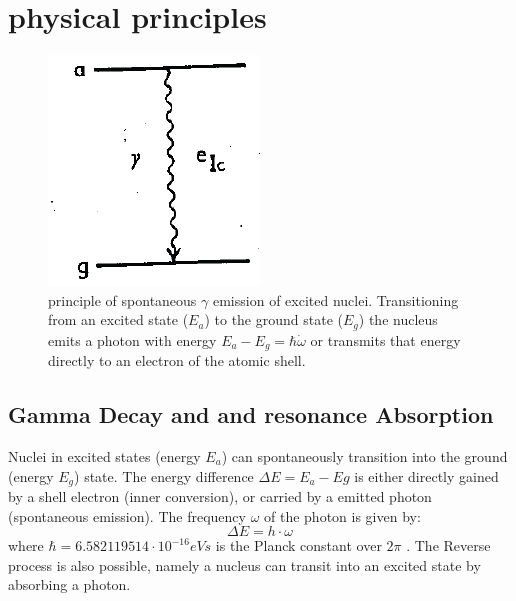 
\section{physical principles}
\begin{figure}[H]
	\centering
	\includegraphics[height=0.18\textheight]{graphics/Emission}
	\caption[spontaneous $\gamma$ emission]{principle of spontaneous $\gamma$ emission of excited nuclei. Transitioning from an excited state ($E_a$) to the ground state ($E_g$) the nucleus emits a photon with energy $E_a-E_g=\hbar\dot \omega$ or transmits that energy directly to an electron of the atomic shell.\cite{Wegener}}
	\label{fig:principles:Emission}
\end{figure}
\subsection{Gamma Decay and and resonance Absorption}
Nuclei in excited states (energy $E_a$) can spontaneously transition into the ground (energy $E_g$) state. The energy difference $\Delta E=E_a-Eg$ is either directly gained by a shell electron (inner conversion), or carried by a emitted photon (spontaneous emission). The frequency $\omega$ of the photon is given by: 
\begin{equation}
\Delta E = h\cdot \omega
\end{equation}
where $\hbar = 6.582 119 514 \cdot 10^{-16} eVs$ is the Planck constant over $2\pi$ \cite{Codata}.
The Reverse process is also possible, namely a nucleus can transit into an excited state by absorbing a photon.

